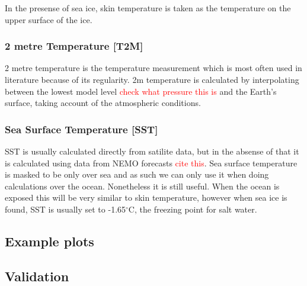 In the presense of sea ice, skin temperature is taken as the temperature on the upper surface of the ice.

\subsubsection*{2 metre Temperature [T2M]}

2 metre temperature is the temperature measurement which is most often used in literature because of its regularity. 2m temperature is calculated by interpolating between the lowest model level \textcolor{red}{check what pressure this is} and the Earth's surface, taking account of the atmospheric conditions.

\subsubsection*{Sea Surface Temperature [SST]}

SST is usually calculated directly from satilite data, but in the absense of that it is calculated using data from NEMO forecasts 
\textcolor{red}{cite this}.
Sea surface temperature is masked to be only over sea and as such we can only use it when doing calculations over the ocean. Nonetheless it is still useful.
When the ocean is exposed this will be very similar to skin temperature, however when sea ice is found, SST is usually set to -1.65$^\circ$C, the freezing point for salt water. 

\subsection{Example plots}


\subsection{Validation}


